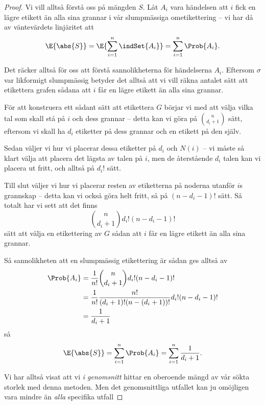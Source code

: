 \documentclass[nobib]{tufte-handout}
\begin{document}
\begin{theorem}
\begin{proof}
        Vi vill alltså förstå oss på mängden $S$. Låt $A_i$ vara händelsen att $i$ fick en lägre etikett än alla sina grannar i vår slumpmässiga ometikettering -- vi har då av väntevärdets linjäritet att
        $$\E{\abs{S}} = \E{\sum_{i=1}^{n} \indSet{A_i}} = \sum_{i=1}^{n} \Prob{A_i}.$$
        
        Det räcker alltså för oss att förstå sannolikheterna för händelserna $A_i$. Eftersom $\sigma$ var likformigt slumpmässig betyder det alltså att vi vill räkna antalet sätt att etikettera grafen sådana att $i$ får en lägre etikett än alla sina grannar.

        För att konstruera ett sådant sätt att etikettera $G$ börjar vi med att välja vilka tal som skall stå på $i$ och dess grannar -- detta kan vi göra på $\binom{n}{d_i + 1}$ sätt, eftersom vi skall ha $d_i$ etiketter på dess grannar och en etikett på den själv.

        Sedan väljer vi hur vi placerar dessa etiketter på $d_i$ och $N(i)$ -- vi måste så klart välja att placera det lägsta av talen på $i$, men de återstående $d_i$ talen kan vi placera ut fritt, och alltså på $d_i!$ sätt.

        Till slut väljer vi hur vi placerar resten av etiketterna på noderna utanför $i$s grannskap -- detta kan vi också göra helt fritt, så på $(n - d_i - 1)!$ sätt. Så totalt har vi sett att det finns
        $$\binom{n}{d_i + 1} d_i! (n - d_i - 1)!$$
        sätt att välja en etikettering av $G$ sådan att $i$ får en lägre etikett än alla sina grannar.

        Så sannolikheten att en slumpmässig etikettering är sådan ges alltså av
        \begin{align*}
            \Prob{A_i} &= \frac{1}{n!}\binom{n}{d_i + 1} d_i! (n - d_i - 1)!\\
            &= \frac{1}{n!}\frac{n!}{(d_i + 1)!(n - (d_i + 1))!}d_i! (n - d_i - 1)!\\
            &= \frac{1}{d_i + 1}
        \end{align*}
        så
        $$\E{\abs{S}} = \sum_{i=1}^{n} \Prob{A_i} = \sum_{i=1}^{n} \frac{1}{d_i + 1}.$$

        Vi har alltså visat att vi \emph{i genomsnitt} hittar en oberoende mängd av vår sökta storlek med denna metoden. Men det genomsnittliga utfallet kan ju omöjligen vara mindre än \emph{alla} specifika utfall
\end{proof}
\end{theorem}
\end{document}
